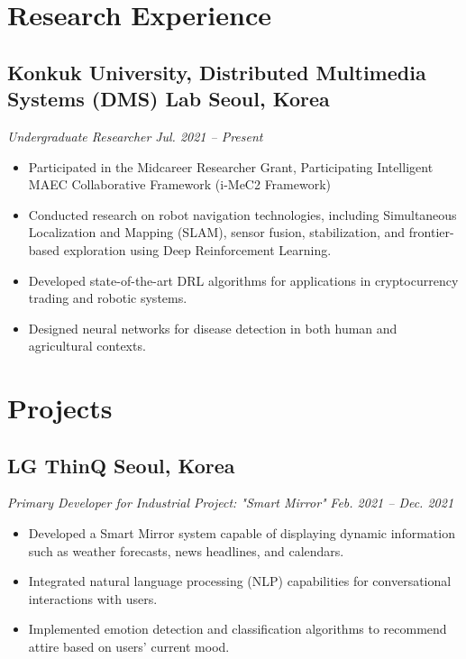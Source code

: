 \documentclass[11pt,a4paper]{article}
\begin{document}
\section*{Research Experience}
\subsection*{\textbf{Konkuk University, Distributed Multimedia Systems (DMS) Lab} \hfill Seoul, Korea}
\textit{Undergraduate Researcher} \hfill \textit{Jul. 2021 – Present}
\begin{itemize}
	\item Participated in the Midcareer Researcher Grant, Participating Intelligent MAEC Collaborative Framework (i-MeC2 Framework)
    \item Conducted research on robot navigation technologies, including Simultaneous Localization and Mapping (SLAM), sensor fusion, stabilization, and frontier-based exploration using Deep Reinforcement Learning.
    \item Developed state-of-the-art DRL algorithms for applications in cryptocurrency trading and robotic systems.
    \item Designed neural networks for disease detection in both human and agricultural contexts.
\end{itemize}


\section*{Projects}
\subsection*{\textbf{LG ThinQ} \hfill Seoul, Korea}
\textit{Primary Developer for Industrial Project: "Smart Mirror"} \hfill \textit{Feb. 2021 – Dec. 2021}
\begin{itemize}
    \item Developed a Smart Mirror system capable of displaying dynamic information such as weather forecasts, news headlines, and calendars.
    \item Integrated natural language processing (NLP) capabilities for conversational interactions with users.
    \item Implemented emotion detection and classification algorithms to recommend attire based on users' current mood.
\end{itemize}
\end{document}
